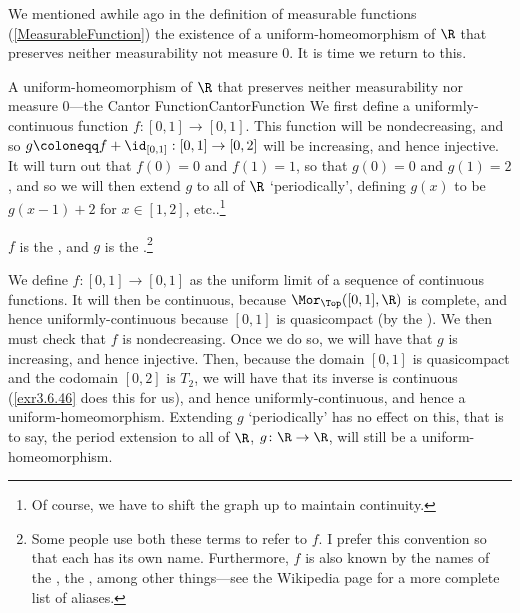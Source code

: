 We mentioned awhile ago in the definition of measurable functions (\cref{MeasurableFunction}) the existence of a uniform-homeomorphism of $\R$ that preserves neither measurability not measure $0$.  It is time we return to this.
\begin{exm}{A uniform-homeomorphism of $\R$ that preserves neither measurability nor measure $0$---the Cantor Function}{CantorFunction}
We first define a uniformly-continuous function $f\colon [0,1]\rightarrow [0,1]$.  This function will be nondecreasing, and so $g\coloneqq f+\id _{[0,1]}:[0,1]\rightarrow [0,2]$ will be increasing, and hence injective.  It will turn out that $f(0)=0$ and $f(1)=1$, so that $g(0)=0$ and $g(1)=2$, and so we will then extend $g$ to all of $\R$ `periodically', defining $g(x)$ to be $g(x-1)+2$ for $x\in [1,2]$, etc..\footnote{Of course, we have to shift the graph up to maintain continuity.} 
\begin{rmk}
$f$ is the , and $g$ is the .\footnote{Some people use both these terms to refer to $f$.  I prefer this convention so that each has its own name.  Furthermore, $f$ is also known by the names of the , the , among other things---see the Wikipedia page for a more complete list of aliases.}
\end{rmk}

We define $f\colon [0,1]\rightarrow [0,1]$ as the uniform limit of a sequence of continuous functions.  It will then be continuous, because $\Mor _{\Top}([0,1],\R )$ is complete, and hence uniformly-continuous because $[0,1]$ is quasicompact (by the ).  We then must check that $f$ is nondecreasing.  Once we do so, we will have that $g$ is increasing, and hence injective.  Then, because the domain $[0,1]$ is quasicompact and the codomain $[0,2]$ is $T_2$, we will have that its inverse is continuous (\cref{exr3.6.46} does this for us), and hence uniformly-continuous, and hence a uniform-homeomorphism.  Extending $g$ `periodically' has no effect on this, that is to say, the period extension to all of $\R$, $g\colon \R \rightarrow \R$, will still be a uniform-homeomorphism.


\end{exm}
